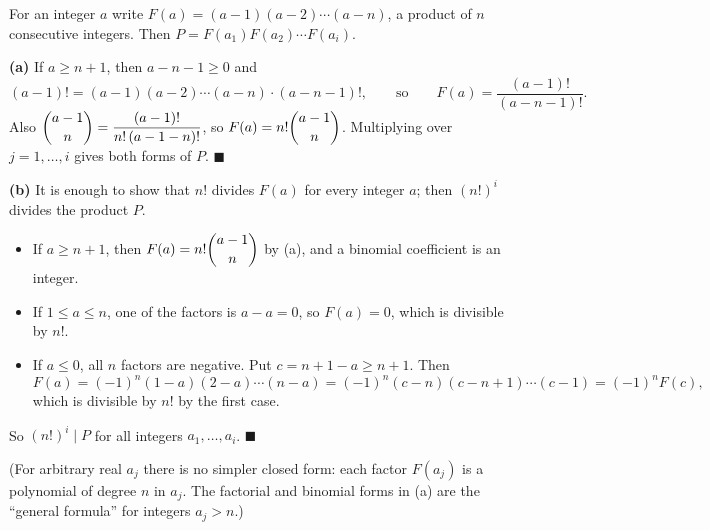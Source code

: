 For an integer $a$ write $F(a)=(a-1)(a-2)\cdots(a-n)$, a product of $n$ consecutive integers. Then $P=F(a_1)F(a_2)\cdots F(a_i)$.

\textbf{(a)} If $a\ge n+1$, then $a-n-1\ge0$ and
\[(a-1)!=(a-1)(a-2)\cdots(a-n)\cdot(a-n-1)!,\qquad\text{so}\qquad F(a)=\dfrac{(a-1)!}{(a-n-1)!}.\]
Also $\dbinom{a-1}{n}=\dfrac{(a-1)!}{n!\,(a-1-n)!}$, so $F(a)=n!\dbinom{a-1}{n}$. Multiplying over $j=1,\dots,i$ gives both forms of $P$. $\blacksquare$

\textbf{(b)} It is enough to show that $n!$ divides $F(a)$ for every integer $a$; then $(n!)^i$ divides the product $P$.
\begin{itemize}
\item If $a\ge n+1$, then $F(a)=n!\dbinom{a-1}{n}$ by (a), and a binomial coefficient is an integer.
\item If $1\le a\le n$, one of the factors is $a-a=0$, so $F(a)=0$, which is divisible by $n!$.
\item If $a\le0$, all $n$ factors are negative. Put $c=n+1-a\ge n+1$. Then
\[F(a)=(-1)^n(1-a)(2-a)\cdots(n-a)=(-1)^n(c-n)(c-n+1)\cdots(c-1)=(-1)^nF(c),\]
which is divisible by $n!$ by the first case.
\end{itemize}
So $(n!)^i\mid P$ for all integers $a_1,\dots,a_i$. $\blacksquare$

(For arbitrary real $a_j$ there is no simpler closed form: each factor $F(a_j)$ is a polynomial of degree $n$ in $a_j$. The factorial and binomial forms in (a) are the ``general formula'' for integers $a_j>n$.)
